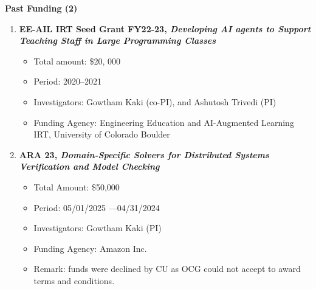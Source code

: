 \documentclass{article}
\begin{document}
\medskip

\noindent\textbf{Past Funding (2) }
\begin{enumerate}
  \item {\bf EE-AIL IRT Seed Grant FY22-23, \emph{Developing AI agents to Support Teaching Staff in Large Programming Classes}}
  \begin{itemize}
  \item
    Total amount: \$20, 000
  \item  
    Period: 2020--2021
  \item Investigators:
   Gowtham Kaki (co-PI), and Ashutosh Trivedi (PI)
  \item Funding Agency: Engineering Education and AI-Augmented Learning IRT, University of Colorado Boulder
  \end{itemize}

  \item {\bf ARA 23, \emph{Domain-Specific Solvers for Distributed Systems
Verification and Model Checking}}
  \begin{itemize}
    \item 
      Total Amount: \$50,000
    \item 
      Period: 05/01/2025 ---04/31/2024
    \item 
      Investigators: Gowtham Kaki (PI)
    \item 
      Funding Agency: Amazon Inc.
    \item Remark: funds were declined by CU as OCG could not accept to award terms and conditions.
\end{itemize}  
\end{enumerate}

\medskip
\end{document}
